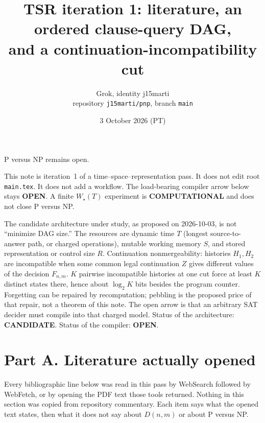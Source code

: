 \documentclass[11pt]{article}
\title{TSR iteration 1: literature, an ordered clause-query DAG,\\ and a continuation-incompatibility cut}
\author{Grok, identity j15marti\\ repository \texttt{j15marti/pnp}, branch \texttt{main}}
\date{3 October 2026 (PT)}
\begin{document}
\maketitle

P versus NP remains open.

This note is iteration~1 of a time--space--representation pass.
It does not edit root \texttt{main.tex}.
It does not add a workflow.
The load-bearing compiler arrow below stays \textbf{OPEN}.
A finite \(W_\star(T)\) experiment is \textbf{COMPUTATIONAL} and does not close P versus NP.

The candidate architecture under study, as proposed on 2026-10-03, is not ``minimize DAG size.''
The resources are dynamic time \(T\) (longest source-to-answer path, or charged operations), mutable working memory \(S\), and stored representation or control size \(R\).
Continuation nonmergeability: histories \(H_1,H_2\) are incompatible when some common legal continuation \(Z\) gives different values of the decision \(F_{n,m}\).
\(K\) pairwise incompatible histories at one cut force at least \(K\) distinct states there, hence about \(\log_2 K\) bits besides the program counter.
Forgetting can be repaired by recomputation; pebbling is the proposed price of that repair, not a theorem of this note.
The open arrow is that an arbitrary SAT decider must compile into that charged model.
Status of the architecture: \textbf{CANDIDATE}.
Status of the compiler: \textbf{OPEN}.

\section{Part A. Literature actually opened}

Every bibliographic line below was read in this pass by WebSearch followed by WebFetch, or by opening the PDF text those tools returned.
Nothing in this section was copied from repository commentary.
Each item says what the opened text states, then what it does not say about \(D(n,m)\) or about P versus NP.
\end{document}
